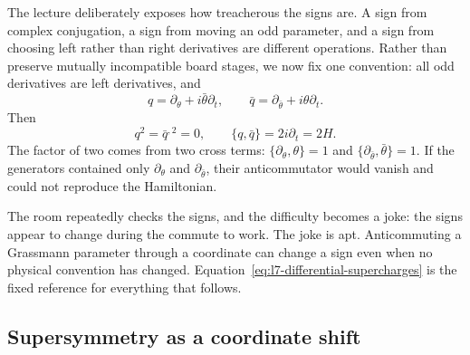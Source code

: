 The lecture deliberately exposes how treacherous the signs are. A sign from complex conjugation, a sign from moving an odd parameter, and a sign from choosing left rather than right derivatives are different operations. Rather than preserve mutually incompatible board stages, we now fix one convention: all odd derivatives are left derivatives, and
\begin{equation}
q=\partial_\theta+i\bar\theta\partial_t,
\qquad
\bar q=\partial_{\bar\theta}+i\theta\partial_t.
\label{eq:l7-differential-supercharges}
\end{equation}
Then
\begin{equation}
q^2=\bar q^{,2}=0,
\qquad
\{q,\bar q\}=2i\partial_t=2H.
\label{eq:l7-differential-algebra}
\end{equation}
The factor of two comes from two cross terms: \(\{\partial_\theta,\theta\}=1\) and \(\{\partial_{\bar\theta},\bar\theta\}=1\). If the generators contained only \(\partial_\theta\) and \(\partial_{\bar\theta}\), their anticommutator would vanish and could not reproduce the Hamiltonian.

\begin{classroomqa}
\end{classroomqa}

The room repeatedly checks the signs, and the difficulty becomes a joke: the signs appear to change during the commute to work. The joke is apt. Anticommuting a Grassmann parameter through a coordinate can change a sign even when no physical convention has changed. Equation~\eqref{eq:l7-differential-supercharges} is the fixed reference for everything that follows.

\subsection{Supersymmetry as a coordinate shift}

